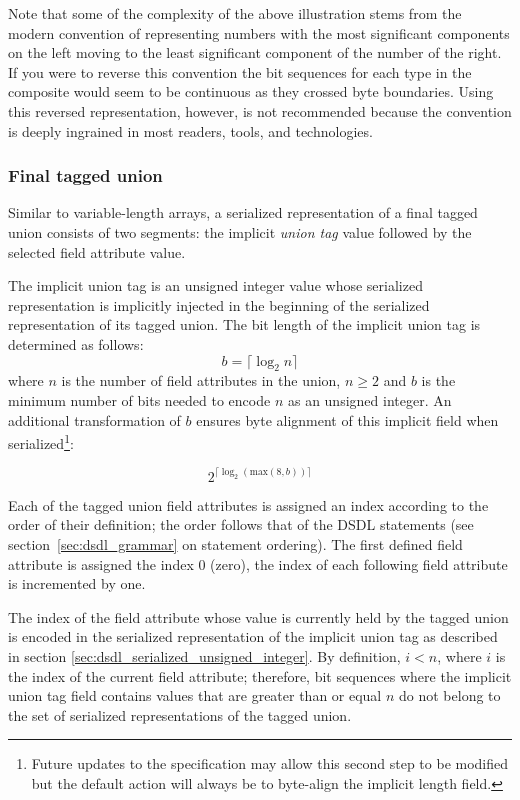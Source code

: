 \begin{remark}
    Note that some of the complexity of the above illustration stems from the modern convention of representing
    numbers with the most significant components on the left moving to the least significant component of the
    number of the right. If you were to reverse this convention the bit sequences for each type in the composite
    would seem to be continuous as they crossed byte boundaries. Using this reversed representation, however, is
    not recommended because the convention is deeply ingrained in most readers, tools, and technologies.
\end{remark}

\subsubsection{Final tagged union}

Similar to variable-length arrays, a serialized representation of a final tagged union consists of two segments:
the implicit \emph{union tag} value followed by the selected field attribute value.

The implicit union tag is an unsigned integer value whose serialized representation
is implicitly injected in the beginning of the serialized representation of its tagged union.
The bit length of the implicit union tag is determined as follows:
$$b=\lceil{}\log_2 n\rceil{}$$
where $n$ is the number of field attributes in the union, $n \geq 2$ and $b$ is the minimum number of bits needed
to encode $n$ as an unsigned integer. An additional transformation of $b$ ensures byte alignment of this implicit
field when serialized\footnote{Future updates to the specification may allow this second step to be modified but
the default action will always be to byte-align the implicit length field.}:

$$2^{\lceil{}\log_2 (\text{max}(8, b))\rceil{}}$$

Each of the tagged union field attributes is assigned an index according to the order of their definition;
the order follows that of the DSDL statements (see section~\ref{sec:dsdl_grammar} on statement ordering).
The first defined field attribute is assigned the index 0 (zero),
the index of each following field attribute is incremented by one.

The index of the field attribute whose value is currently held by the tagged union is encoded
in the serialized representation of the implicit union tag as described in section
\ref{sec:dsdl_serialized_unsigned_integer}.
By definition, $i < n$, where $i$ is the index of the current field attribute;
therefore, bit sequences where the implicit union tag field contains values
that are greater than or equal $n$ do not belong to the set of serialized representations of the tagged union.

